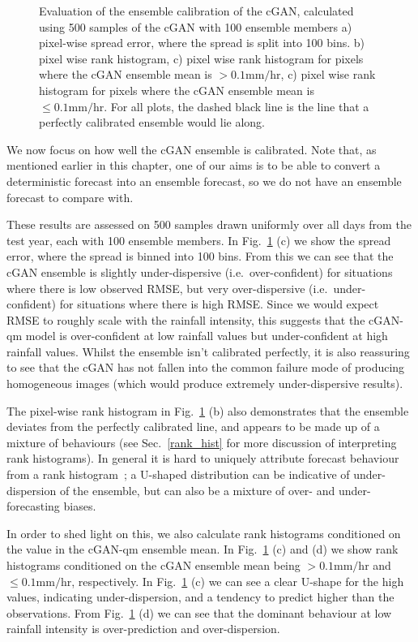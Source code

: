 \documentclass{article}
\begin{document}
\begin{figure}[!ht]
     
     \caption{Evaluation of the ensemble calibration of the cGAN, calculated using 500 samples of the cGAN with 100 ensemble members a) pixel-wise spread error, where the spread is split into 100 bins. b) pixel wise rank histogram, c) pixel wise rank histogram for pixels where the cGAN ensemble mean is $>0.1\text{mm/hr}$, c) pixel wise rank histogram for pixels where the cGAN ensemble mean is $\leq 0.1\text{mm/hr}$. For all plots, the dashed black line is the line that a perfectly calibrated ensemble would lie along. }
     \label{fig:ens_calib}
\end{figure}


We now focus on how well the cGAN ensemble is calibrated. Note that, as mentioned earlier in this chapter, one of our aims is to be able to convert a deterministic forecast into an ensemble forecast, so we do not have an ensemble forecast to compare with.

These results are assessed on 500 samples drawn uniformly over all days from the test year, each with 100 ensemble members. In Fig.~\ref{fig:ens_calib} (c) we show the spread error, where the spread is binned into 100 bins. From this we can see that the cGAN ensemble is slightly under-dispersive (i.e.~over-confident) for situations where there is low observed RMSE, but very over-dispersive (i.e.~under-confident) for situations where there is high RMSE. Since we would expect RMSE to roughly scale with the rainfall intensity, this suggests that the cGAN-qm model is over-confident at low rainfall values but under-confident at high rainfall values. Whilst the ensemble isn't calibrated perfectly, it is also reassuring to see that the cGAN has not fallen into the common failure mode of producing homogeneous images (which would produce extremely under-dispersive results).

The pixel-wise rank histogram in Fig.~\ref{fig:ens_calib} (b) also demonstrates that the ensemble deviates from the perfectly calibrated line, and appears to be made up of a mixture of behaviours (see Sec.~\ref{rank_hist} for more discussion of interpreting rank histograms). In general it is hard to uniquely attribute forecast behaviour from a rank histogram~\citep{hamill_interpretation_2001}; a U-shaped distribution can be indicative of under-dispersion of the ensemble, but can also be a mixture of over- and under-forecasting biases. 

In order to shed light on this, we also calculate rank histograms conditioned on the value in the cGAN-qm ensemble mean. In Fig.~\ref{fig:ens_calib} (c) and (d) we show rank histograms conditioned on the cGAN ensemble mean being $>0.1\text{mm/hr}$ and $\leq 0.1\text{mm/hr}$, respectively. In Fig.~\ref{fig:ens_calib} (c) we can see a clear U-shape for the high values, indicating under-dispersion, and a tendency to predict higher than the observations. From Fig.~\ref{fig:ens_calib} (d) we can see that the dominant behaviour at low rainfall intensity is over-prediction and over-dispersion. 
\end{document}
